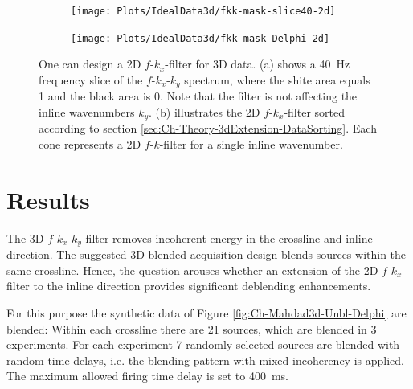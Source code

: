 \begin{figure}

	\centering 
	\begin{subfigure}[t]{0.45\textwidth}
		\centering
		\texttt{[image: Plots/IdealData3d/fkk-mask-slice40-2d]}
		\caption{}
		\label{fig:Ch-Mahdad3d-2dfk-slice}
	\end{subfigure}
	
	\par\bigskip
	
	\centering
	\begin{subfigure}[t]{\textwidth}
		\centering
		\texttt{[image: Plots/IdealData3d/fkk-mask-Delphi-2d]}
		\caption{}
		\label{fig:Ch-Mahdad3d-2dfk-Delphi}
	\end{subfigure}
	
	\caption{One can design a 2D $f$-$k_x$-filter for 3D data. (a) shows a \SI{40}{\hertz} frequency slice of the $f$-$k_x$-$k_y$ spectrum, where the shite area equals 1 and the black area is 0. Note that the filter is not affecting the inline wavenumbers $k_y$. (b) illustrates the 2D $f$-$k_x$-filter sorted according to section \ref{sec:Ch-Theory-3dExtension-DataSorting}. Each cone represents a 2D $f$-$k$-filter for a single inline wavenumber.}
	\label{fig:Ch-Mahdad3d-2dfk}
\end{figure}

\section{Results}

The 3D $f$-$k_x$-$k_y$ filter removes incoherent energy in the crossline and inline direction. The suggested 3D blended acquisition design blends sources within the same crossline. Hence, the question arouses whether an extension of the 2D $f$-$k_x$ filter to the inline direction provides significant deblending enhancements.

For this purpose the synthetic data of Figure \ref{fig:Ch-Mahdad3d-Unbl-Delphi} are blended: Within each crossline there are 21 sources, which are blended in 3 experiments. For each experiment 7 randomly selected sources are blended with random time delays, i.e. the blending pattern with mixed incoherency is applied. The maximum allowed firing time delay is set to \SI{400}{\milli\second}. 

